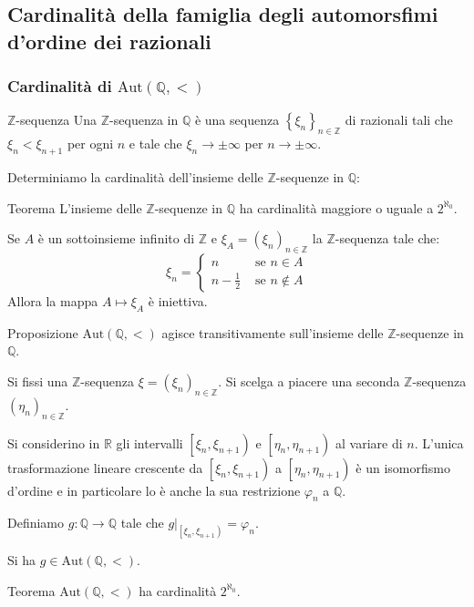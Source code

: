 \documentclass[italian, aspectratio=169,bookmarks=false]{beamer}
\newcommand{\aut}{ \mathrm{Aut} ( \mathbb{Q},< ) } %
\newcommand{\Z}{\mathbb{Z}} %
\newcommand{\Q}{\mathbb{Q}} %
\newcommand{\R}{\mathbb{R}} %
\newcommand{\0}{\setminus\{0\}} %
\theoremstyle{definition}
\theoremstyle{plain}
\begin{document}
\subsection[Cardinalità di $\aut$]{Cardinalità della famiglia degli automorsfimi d'ordine dei razionali}
\begin{frame}
    \frametitle{Cardinalità di $\aut$}
    \begin{block}{$\Z$-sequenza}
        Una $\Z$-sequenza in $\Q$ è una sequenza $\left\{\xi_n \right\}_{n \in \Z}$ di razionali tali che $\xi_n<\xi_{n+1}$ per ogni $n$ e tale che $\xi_n \rightarrow \pm \infty$ per $n \rightarrow \pm \infty$.
    \end{block} \pause
    Determiniamo la cardinalità dell'insieme delle $\Z$-sequenze in $\Q$:
    \begin{alertblock}{Teorema}
    L'insieme delle $\Z$-sequenze in $\Q$ ha cardinalità maggiore o uguale a $2^{\aleph_0}$.            
    \end{alertblock}
\end{frame}
\begin{frame}
    Se $A$ è un sottoinsieme infinito di $\Z$ e $\xi_A=\left(\xi_n\right)_{n \in \Z}$ la $\Z$-sequenza tale che: \pause
    \[\xi_n=\begin{cases}n & \mbox{ se } n \in A \\ n-\frac{1}{2} & \mbox{ se } n \notin A \end{cases}\] \pause
    Allora la mappa $A \mapsto \xi_A$ è iniettiva.
\end{frame}
\begin{frame}
\begin{alertblock}{Proposizione}
$\aut$ agisce transitivamente sull'insieme delle $\Z$-sequenze in $\Q$.
\end{alertblock} \pause
\medskip Si fissi una $\Z$-sequenza $\xi=\left(\xi_n\right)_{n \in \Z}$. \pause
Si scelga a piacere una seconda $\Z$-sequenza $\left(\eta_n\right)_{n \in \Z}$. \pause

\medskip Si considerino in $\R$ gli intervalli $\left[\xi_{n},\xi_{n+1}\right)$ e $\left[\eta_{n},\eta_{n+1}\right)$ al variare di $n$. L'unica trasformazione lineare crescente da $\left[\xi_{n},\xi_{n+1}\right)$ a $\left[\eta_{n},\eta_{n+1}\right)$ è un isomorfismo d'ordine e in particolare lo è anche la sua restrizione $\varphi_n$ a $\Q$.

\end{frame}
\begin{frame}
    Definiamo $g: \Q \rightarrow \Q$ tale che $g|_{\left[\xi_{n},\xi_{n+1}\right)}=\varphi_n$. \pause

    \medskip Si ha $g \in \aut$. \pause
    \medskip
    \begin{alertblock}{Teorema}
        $\aut$ ha cardinalità $2^{\aleph_0}$.
    \end{alertblock}
\end{frame}
\end{document}
